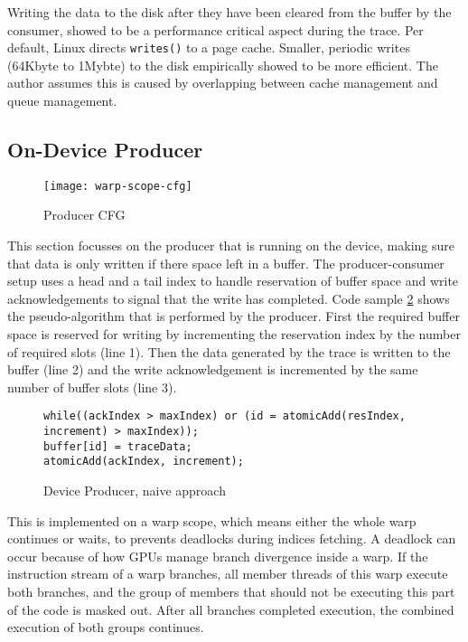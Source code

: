 	Writing the data to the disk after they have been cleared from the buffer by the consumer, showed to be a performance critical aspect during the trace. Per default, Linux directs \verb|writes()| to a page cache. Smaller, periodic writes (64Kbyte to 1Mybte) to the disk empirically showed to be more efficient. The author assumes this is caused by overlapping between cache management and queue management.
	
	\subsection{On-Device Producer}\label{ondevprod}
\begin{figure}[t]
	\centering
	\texttt{[image: warp-scope-cfg]}
	\caption{Producer CFG}
\label{wscfg}
\end{figure}	
	This section focusses on the producer that is running on the device, making sure that data is only written if there space left
	in a buffer. The producer-consumer setup uses a head and a tail index to handle reservation of buffer space and write acknowledgements to signal that the write has completed. Code sample \ref{prod-cons} shows the pseudo-algorithm that is performed by the producer. First the required buffer space is reserved for writing by incrementing the reservation index
	by the number of required slots (line 1). Then the data generated by the trace is
	written to the buffer (line 2) and the write acknowledgement is incremented by the same number of buffer slots (line 3).
\begin{figure}
	\begin{lstlisting}[style=C]
while((ackIndex > maxIndex) or (id = atomicAdd(resIndex, increment) > maxIndex));
buffer[id] = traceData;
atomicAdd(ackIndex, increment);
\end{lstlisting}
	\caption{Device Producer, naive approach}
	\label{prod-cons}
\end{figure}

	
	This is implemented on a warp scope, which means either the whole warp continues or waits, to prevents deadlocks during indices fetching.
	A deadlock can occur because of how GPUs manage branch divergence inside a warp. If the instruction stream of a warp branches, all member threads of this warp execute both branches, and the group of members that should not be executing this part of the code is masked out. After all branches completed execution, the combined execution of both groups continues.
	
